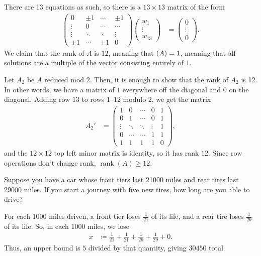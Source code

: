 \documentclass[10pt]{mypackage}
\begin{document}
\begin{solution}
\begin{enumerate}[(a)]
      There are 13 equations as such, so there is a $13\times 13$ matrix of the form
      \begin{align*}
        \begin{pmatrix}0 & \pm 1 & \cdots & \pm 1\\\vdots & 0 & \cdots & \cdots \\ \vdots & \ddots & \ddots & \vdots \\ \pm 1 & \cdots & \pm 1 & 0\end{pmatrix} \begin{pmatrix}w_1\\\vdots\\w_{13}\end{pmatrix} &= \begin{pmatrix}0\\\vdots\\0\end{pmatrix}.
      \end{align*}
      We claim that the rank of $A$ is $12$, meaning that $\null(A) = 1$, meaning that all solutions are a multiple of the vector consisting entirely of $1$.\newline

      Let $A_2$ be $A$ reduced mod $2$. Then, it is enough to show that the rank of $A_2$ is 12. In other words, we have a matrix of $1$ everywhere off the diagonal and $0$ on the diagonal. Adding row $13$ to rows $1$--$12$ modulo $2$, we get the matrix
      \begin{align*}
        A_2' &=  \begin{pmatrix}
1 & 0 & \cdots & 0 & 1 \\
0 & 1 & \cdots & 0 & 1 \\
\vdots & \ddots & \ddots & \vdots & 1 \\
0 & \cdots & \cdots & 1 & 1 \\
1 & 1 & 1 & 1 & 0 
\end{pmatrix}  ,
      \end{align*}
      and the $12\times 12$ top left minor matrix is identity, so it has rank $12$. Since row operations don't change rank, $\operatorname{rank}\left( A \right) \geq 12$.
  \end{enumerate}
\end{solution}
\begin{problem}
  Suppose you have a car whose front tiers last 21000 miles and rear tires last 29000 miles. If you start a journey with five new tires, how long are you able to drive?
\end{problem}
\begin{solution}
  For each 1000 miles driven, a front tier loses $\frac{1}{21}$ of its life, and a rear tire loses $\frac{1}{29}$ of its life. So, in each 1000 miles, we lose
  \begin{align*}
    x &\coloneq \frac{1}{21} + \frac{1}{21} + \frac{1}{29} + \frac{1}{29} + 0.
  \end{align*}
  Thus, an upper bound is $5$ divided by that quantity, giving $30450$ total.
\end{solution}
\end{document}
